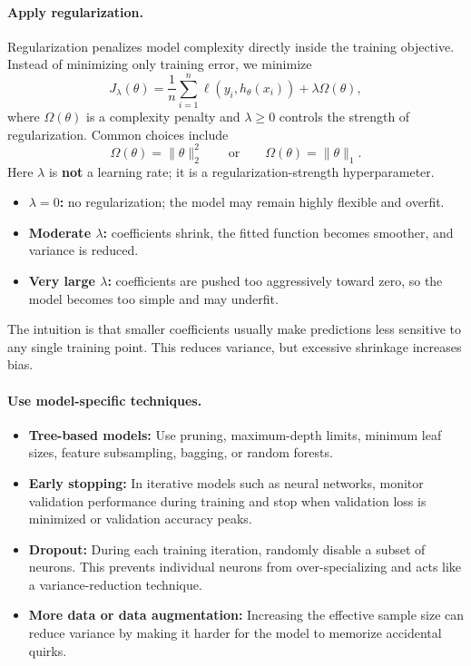 \documentclass[12pt,openany]{book}
\begin{document}
\paragraph{Apply regularization.}
Regularization penalizes model complexity directly inside the training objective. Instead of minimizing only training error, we minimize
\begin{equation*}
    J_{\lambda}(\theta)
    = \frac{1}{n}\sum_{i=1}^{n}\ell\!\left(y_i,h_{\theta}(x_i)\right)
    + \lambda\Omega(\theta),
\end{equation*}
where \(\Omega(\theta)\) is a complexity penalty and \(\lambda\geq 0\) controls the strength of regularization. Common choices include
\begin{equation*}
    \Omega(\theta)=\|\theta\|_2^2
    \qquad \text{or} \qquad
    \Omega(\theta)=\|\theta\|_1.
\end{equation*}
Here \(\lambda\) is \textbf{not} a learning rate; it is a regularization-strength hyperparameter.

\begin{itemize}[leftmargin=*]
    \item \textbf{\(\lambda=0\):} no regularization; the model may remain highly flexible and overfit.
    \item \textbf{Moderate \(\lambda\):} coefficients shrink, the fitted function becomes smoother, and variance is reduced.
    \item \textbf{Very large \(\lambda\):} coefficients are pushed too aggressively toward zero, so the model becomes too simple and may underfit.
\end{itemize}

The intuition is that smaller coefficients usually make predictions less sensitive to any single training point. This reduces variance, but excessive shrinkage increases bias.

\paragraph{Use model-specific techniques.}
\begin{itemize}[leftmargin=*]
    \item \textbf{Tree-based models:} Use pruning, maximum-depth limits, minimum leaf sizes, feature subsampling, bagging, or random forests.
    \item \textbf{Early stopping:} In iterative models such as neural networks, monitor validation performance during training and stop when validation loss is minimized or validation accuracy peaks.
    \item \textbf{Dropout:} During each training iteration, randomly disable a subset of neurons. This prevents individual neurons from over-specializing and acts like a variance-reduction technique.
    \item \textbf{More data or data augmentation:} Increasing the effective sample size can reduce variance by making it harder for the model to memorize accidental quirks.
\end{itemize}
\end{document}
